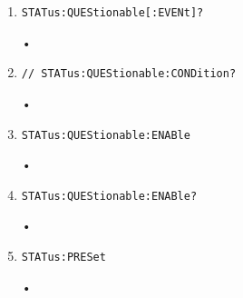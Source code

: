 \documentclass[a4paper,10pt]{article}
\begin{document}
\begin{enumerate}
\begin{enumerate}
		\item 
		    \begin{verbatim}STATus:QUEStionable[:EVENt]?\end{verbatim}
		    \begin{description}
		        •
		    \end{description}
		\item
		    \begin{verbatim}// STATus:QUEStionable:CONDition?\end{verbatim}
		    \begin{description}
		        •
		    \end{description}
		\item 
		    \begin{verbatim}STATus:QUEStionable:ENABle\end{verbatim}
		    \begin{description}
		        •
		    \end{description}
		\item 
		    \begin{verbatim}STATus:QUEStionable:ENABle?\end{verbatim}
		    \begin{description}
		        •
		    \end{description}

		\item 
		    \begin{verbatim}STATus:PRESet\end{verbatim}
		    \begin{description}
		        •
		    \end{description}


\end{enumerate}
\end{enumerate}
\end{document}
